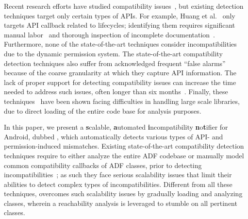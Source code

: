 Recent research efforts have studied compatibility
issues~\cite{huang2018understanding,wei2016taming,wu2017measuring},
but existing detection techniques target only certain
types of APIs.  For example, Huang et
al.~\cite{huang2018understanding} only targets API
callback related to lifecycles; identifying them requires
significant manual labor~\cite{huang2018understanding}
and thorough inspection of incomplete
documentation~\cite{wu2017measuring}.  Furthermore,
none of the state-of-the-art techniques consider
incompatibilities due to the dynamic permission system.
The state-of-the-art compatibility detection techniques
also suffer from acknowledged frequent ``false alarms''
because of the coarse granularity at which they capture
API information.  The lack of proper support for
detecting compatibility issues can increase the time
needed to address such issues, often longer than six 
months~\cite{siliconangle}.
Finally, these techniques~\cite{huang2018understanding,he2018understanding} have been shown facing difficulties in handling large scale libraries, due to direct loading of the entire code base for analysis purposes.




\sloppy In this paper, we present a \textbf{s}calable, \textbf{a}utomated
\textbf{i}ncompatibility \textbf{n}o\textbf{t}ifier for Android, dubbed \@approach, which automatically 
detects various types of API- and permission-induced mismatches.
Existing state-of-the-art compatibility detection techniques
require to either analyze the entire ADF codebase or manually model common compatibility callbacks of ADF classes, prior to detecting incompatibilities~\cite{huang2018understanding,lili2018cid,he2018understanding};
as such they face serious scalability issues that limit their abilities to detect complex types of incompatibilities. 
Different from all these techniques, \@approach overcomes such scalability issues by gradually loading and analyzing classes, wherein a reachability analysis is leveraged to stumble on all pertinent classes.


